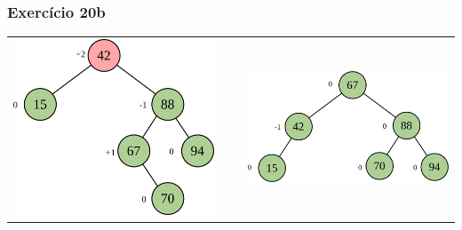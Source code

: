 \documentclass[aspectratio=169]{beamer}
\begin{document}
\begin{frame}[fragile]\frametitle{Exercício 20b}
\begin{tabular}{lll}
\includegraphics[height=0.45\paperheight]{imagens/avl20c.png} & ~ ~ &
\includegraphics[height=0.33\paperheight]{imagens/avl20d.png} \\
\end{tabular}
\end{frame}
\end{document}
